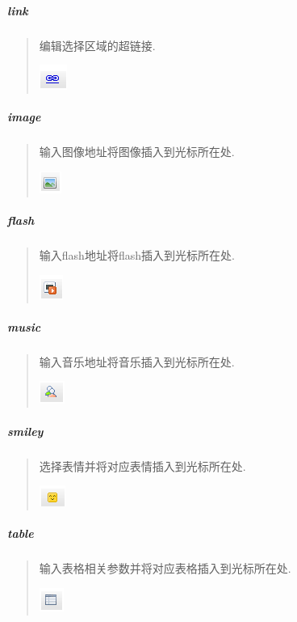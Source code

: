 \documentclass[letterpaper,10pt,english]{sphinxmanual}
\begin{document}
\subparagraph{link}
\label{relatedproj/editorguide/plugin:link}\begin{quote}

编辑选择区域的超链接.

\includegraphics{link1.png}
\end{quote}


\subparagraph{image}
\label{relatedproj/editorguide/plugin:image}\begin{quote}

输入图像地址将图像插入到光标所在处.

\includegraphics{image1.png}
\end{quote}


\subparagraph{flash}
\label{relatedproj/editorguide/plugin:flash}\begin{quote}

输入flash地址将flash插入到光标所在处.

\includegraphics{flash1.png}
\end{quote}


\subparagraph{music}
\label{relatedproj/editorguide/plugin:music}\begin{quote}

输入音乐地址将音乐插入到光标所在处.

\includegraphics{music1.png}
\end{quote}


\subparagraph{smiley}
\label{relatedproj/editorguide/plugin:smiley}\begin{quote}

选择表情并将对应表情插入到光标所在处.

\includegraphics{smiley1.png}
\end{quote}


\subparagraph{table}
\label{relatedproj/editorguide/plugin:table}\begin{quote}

输入表格相关参数并将对应表格插入到光标所在处.

\includegraphics{table1.png}
\end{quote}
\end{document}
